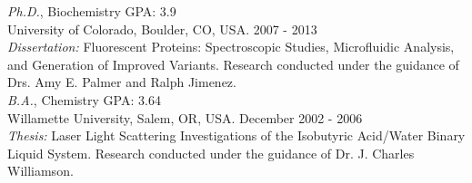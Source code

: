{\sl Ph.D.}, Biochemistry \hfill GPA: 3.9 
\\ University of Colorado, Boulder, CO, USA. \hfill 2007 - 2013 \\ 
{\it Dissertation:} Fluorescent Proteins: Spectroscopic Studies, Microfluidic Analysis, and Generation of Improved Variants.  Research conducted under the guidance of Drs. Amy E. Palmer and Ralph Jimenez. \\

{\sl B.A.}, Chemistry \hfill GPA: 3.64 
\\ Willamette University, Salem, OR, USA. \hfill December 2002 - 2006\\
{\it Thesis:} Laser Light Scattering Investigations of the Isobutyric Acid/Water Binary Liquid System.  Research conducted under the guidance of Dr. J. Charles Williamson.
